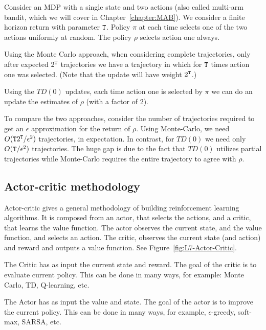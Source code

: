 \begin{example}
Consider an MDP with a single state and two actions (also called multi-arm bandit, which we will cover in Chapter~\ref{chapter:MAB}). We consider a finite horizon return with parameter ${\tt T}$. Policy $\pi$ at each time selects one of the two actions uniformly at random. The policy $\rho$ selects action one always.

Using the Monte Carlo approach, when considering complete trajectories, only after expected  $ 2^{\tt T}$ trajectories we have a trajectory in which for ${\tt T}$ times action one was selected. (Note that the update will have weight $2^{\tt T}$.)

Using the $TD(0)$ updates, each time action one is selected by $\pi$ we can do an update the estimates of $\rho$ (with a factor of $2$). 

To compare the two approaches, consider the number of trajectories required to get an $\epsilon$ approximation for the return of $\rho$. Using Monte-Carlo, we need $O({\tt T} 2^{\tt T}/\epsilon^2)$ trajectories, in expectation. In contrast, for $TD(0)$ we need only $O({\tt T}/\epsilon^2)$ trajectories. The huge gap is due to the fact that $TD(0)$ utilizes partial trajectories while Monte-Carlo requires the entire trajectory to agree with $\rho$.
\end{example}

\subsection{Actor-critic methodology}
\label{section:actor-critic}

Actor-critic gives a general methodology of building reinforcement
learning algorithms. It is composed from an actor, that selects the
actions, and a critic, that learns the value function. The actor
observes the current state, and the value function, and selects an
action. The critic, observes the current state (and action) and
reward and outputs a value function. See
Figure~\ref{fig:L7-Actor-Critic}.

The Critic has as input the current state and reward. The goal of the critic is to evaluate current policy. This can be done in many ways, for example:
Monte Carlo, TD, Q-learning, etc.

The Actor has as input the value and state. The goal of the actor is to improve the current policy. This can be done in many ways, for example, $\epsilon$-greedy, soft-max, SARSA, etc.



